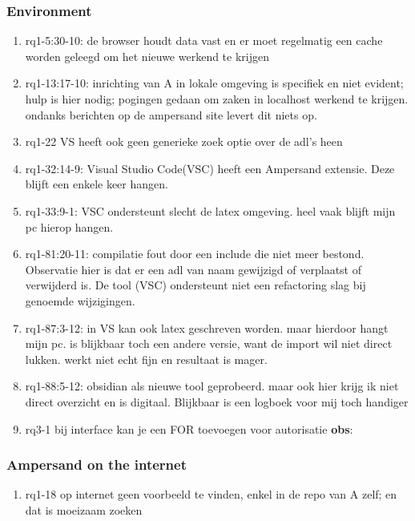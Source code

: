 \subsubsection{Environment}
\begin{comment}
plaats hier de afgehandelde items.
\end{comment}
\begin{enumerate}
    \item rq1-5:30-10: de browser houdt data vast en er moet regelmatig een cache worden geleegd om het nieuwe werkend te krijgen
    \item rq1-13:17-10: inrichting van A in lokale omgeving is specifiek en niet evident; hulp is hier nodig; pogingen gedaan om zaken in localhost werkend te krijgen. ondanks berichten op de ampersand site levert dit niets op.
    \item rq1-22 VS heeft ook geen generieke zoek optie over de adl's heen
    \item rq1-32:14-9: Visual Studio Code(VSC) heeft een Ampersand extensie. Deze blijft een enkele keer hangen.
    \item rq1-33:9-1: VSC ondersteunt slecht de latex omgeving. heel vaak blijft mijn pc hierop hangen.  
    \item rq1-81:20-11: compilatie fout door een include die niet meer bestond. Observatie hier is dat er een adl van naam gewijzigd of verplaatst of verwijderd is. De tool (VSC) ondersteunt niet een refactoring slag bij genoemde wijzigingen. 
    \item rq1-87:3-12: in VS kan ook latex geschreven worden. maar hierdoor hangt mijn pc. is blijkbaar toch een andere versie, want de import wil niet direct lukken. werkt niet echt fijn en resultaat is mager. 
    \item rq1-88:5-12: obsidian als nieuwe tool geprobeerd. maar ook hier krijg ik niet direct overzicht en is digitaal. Blijkbaar is een logboek voor mij toch handiger
    \item rq3-1 bij interface kan je een FOR toevoegen voor autorisatie
    \newline\textbf{obs}:

\end{enumerate}

\subsubsection{Ampersand on the internet}
\begin{comment}
plaats hier de afgehandelde items.
\end{comment}
\begin{enumerate}
    \item rq1-18 op internet geen voorbeeld te vinden, enkel in de repo van A zelf; en dat is moeizaam zoeken    
\end{enumerate}

